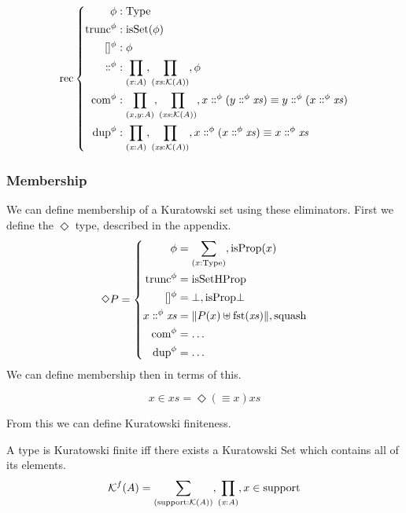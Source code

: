 \begin{equation} \label{kuratowski-rec}
  \text{rec} \left\{ \begin{aligned}
    \phi &: \text{Type} \\
    \text{trunc}^\phi &: \text{isSet}(\phi) \\
    []^\phi &: \phi \\
    \dblcolon^\phi &: \pifun{x}{A} , \pifun{xs}{\mathcal{K}(A)} , \phi \\
    \text{com}^\phi &: \prod_{(x , y : A)} , \pifun{xs}{\mathcal{K}(A)} , x \dblcolon^\phi (y \dblcolon^\phi \mathit{xs}) \equiv y \dblcolon^\phi (x \dblcolon^\phi \mathit{xs}) \\
    \text{dup}^\phi &: \pifun{x}{A} , \pifun{xs}{\mathcal{K}(A)} , x \dblcolon^\phi (x \dblcolon^\phi \mathit{xs}) \equiv x \dblcolon^\phi \mathit{xs}
  \end{aligned} \right.
\end{equation}


\subsubsection{Membership}
We can define membership of a Kuratowski set using these eliminators.
First we define the \(\Diamond\) type, described in the appendix.
\begin{equation}
  \Diamond P = \left\{ \begin{aligned}
    \phi &= \sum_{(x : \text{Type})} , \text{isProp}(x) \\
    \text{trunc}^\phi &= \text{isSetHProp} \\
    []^\phi &= \bot , \text{isProp}\bot \\
    x \dblcolon^\phi \mathit{xs} &= \lVert P(x) \uplus \text{fst}(\mathit{xs}) \rVert , \text{squash} \\
    \text{com}^\phi &= \dots \\
    \text{dup}^\phi &= \dots
  \end{aligned} \right.
\end{equation}
We can define membership then in terms of this.
\begin{definition}
  \begin{equation}
    x \in \mathit{xs} = \Diamond (\equiv x) \mathit{xs}
  \end{equation}
\end{definition}

From this we can define Kuratowski finiteness.
\begin{definition}
  A type is Kuratowski finite iff there exists a Kuratowski Set which contains
  all of its elements.
  \begin{equation}
    \mathcal{K}^{f}(A) = \sum_{(\text{support} : \mathcal{K}(A))} , \prod_{\left( \mathit{ x } : A \right)} , x \in \text{support}
  \end{equation}
\end{definition}

